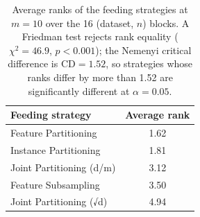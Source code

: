 \begin{table}[ht]
\centering\small
\begin{tabular}{lc}
\toprule
Feeding strategy & Average rank \\
\midrule
Feature Partitioning & 1.62 \\
Instance Partitioning & 1.81 \\
Joint Partitioning (d/m) & 3.12 \\
Feature Subsampling & 3.50 \\
Joint Partitioning (√d) & 4.94 \\
\bottomrule
\end{tabular}
\caption{Average ranks of the feeding strategies at $m=10$ over the 16 (dataset, $n$) blocks. A Friedman test rejects rank equality ($\chi^2=46.9$, $p<0.001$); the Nemenyi critical difference is $\mathrm{CD}=1.52$, so strategies whose ranks differ by more than 1.52 are significantly different at $\alpha=0.05$.}
\label{tab:feeding_friedman}
\end{table}
